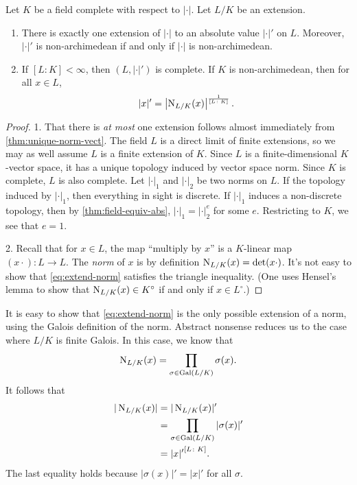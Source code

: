\begin{theorem}\label{thm:extend-absolute-value}
Let $K$ be a field complete with respect to $|\cdot|$. Let $L/K$ be an 
extension. 
\begin{enumerate}
\item 
There is exactly one extension of $|\cdot|$ to an absolute value $|\cdot|'$ on 
$L$. Moreover, $|\cdot|'$ is non-archimedean if and only if $|\cdot|$ is 
non-archimedean. 

\item
If $[L \colon K]<\infty$, then $(L,|\cdot|')$ is complete. If $K$ is 
non-archimedean, then for all $x\in L$, 
\begin{equation}\label{eq:extend-norm}
  |x|' = \left|\operatorname{N}_{L/K}(x)\right|^{\frac{1}{[L\colon K]}} .
\end{equation}
\end{enumerate}
\end{theorem}
\begin{proof}
1. That there is \emph{at most} one extension follows almost immediately from 
\autoref{thm:unique-norm-vect}. The field $L$ is a direct limit of finite 
extensions, so we may as well assume $L$ is a finite extension of $K$. Since 
$L$ is a finite-dimensional $K$-vector space, it has a unique topology 
induced by vector space norm. Since $K$ is complete, $L$ is also complete. Let 
$|\cdot|_1$ and $|\cdot|_2$ be two norms on $L$. If the topology induced 
by $|\cdot|_1$, then everything in sight is discrete. If $|\cdot|_1$ induces 
a non-discrete topology, then by \autoref{thm:field-equiv-abs}, 
$|\cdot|_1=|\cdot|_2^e$ for some $e$. Restricting to $K$, we see that $e=1$. 

2. Recall that for $x\in L$, the map ``multiply by $x$'' is a $K$-linear map 
$(x\cdot)\colon L\to L$. The \emph{norm} of $x$ is by definition 
$\operatorname{N}_{L/K}(x)=\det(x\cdot)$. It's not easy to show that 
\eqref{eq:extend-norm} satisfies the triangle inequality. (One uses Hensel's 
lemma to show that $\operatorname{N}_{L/K}(x)\in K^\circ$ if and only if 
$x\in L^\circ$.)
\end{proof}

It is easy to show that \eqref{eq:extend-norm} is the only possible extension 
of a norm, using the Galois definition of the norm. Abstract nonsense reduces 
us to the case where $L/K$ is finite Galois. In this case, we know that 
\[
  \operatorname{N}_{L/K}(x) = \prod_{\sigma\in \operatorname{Gal}(L/K)}\sigma(x) .
\]
It follows that 
\begin{align*}
  |\operatorname{N}_{L/K}(x)| 
    &= |\operatorname{N}_{L/K}(x)|' \\
    &= \prod_{\sigma\in \operatorname{Gal}(L/K)} |\sigma(x)|' \\
    &= {|x|'}^{[L\colon K]} .
\end{align*}
The last equality holds because $|\sigma(x)|'=|x|'$ for all $\sigma$. 

